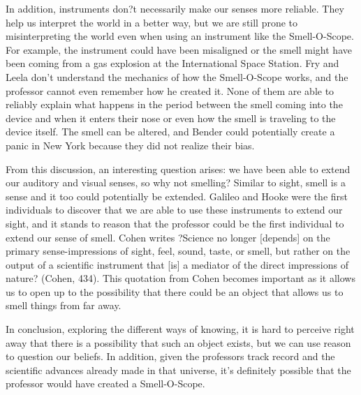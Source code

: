 \documentclass[11pt, oneside]{article}
\begin{document}
\par In addition, instruments don?t necessarily make our senses more reliable. They help us interpret the world in a better way, but we are still prone to misinterpreting the world even when using an instrument like the Smell-O-Scope. For example, the instrument could have been misaligned or the smell might have been coming from a gas explosion at the International Space Station. Fry and Leela don't understand the mechanics of how the Smell-O-Scope works, and the professor cannot even remember how he created it. None of them are able to reliably explain what happens in the period between the smell coming into the device and when it enters their nose or even how the smell is traveling to the device itself. The smell can be altered, and Bender could potentially create a panic in New York because they did not realize their bias.

\par From this discussion, an interesting question arises: we have been able to extend our auditory and visual senses, so why not smelling? Similar to sight, smell is a sense and it too could potentially be extended. Galileo and Hooke were the first individuals to discover that we are able to use these instruments to extend our sight, and it stands to reason that the professor could be the first individual to extend our sense of smell. Cohen writes ?Science no longer [depends] on the primary sense-impressions of sight, feel, sound, taste, or smell, but rather on the output of a scientific instrument that [is] a mediator of the direct impressions of nature? (Cohen, 434). This quotation from Cohen becomes important as it allows us to open up to the possibility that there could be an object that allows us to smell things from far away.

\par In conclusion, exploring the different ways of knowing, it is hard to perceive right away that there is a possibility that such an object exists, but we can use reason to question our beliefs. In addition, given the professors track record and the scientific advances already made in that universe, it's definitely possible that the professor would have created a Smell-O-Scope.
\end{document}
